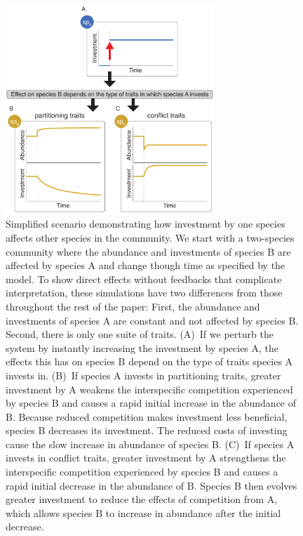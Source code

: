 \documentclass[11pt]{article}
\begin{document}
\begin{figure}[ht!]
\centering
\includegraphics[width=0.7\textwidth,keepaspectratio]{1-diagram}
\caption{Simplified scenario demonstrating how investment by
one species affects other species in the community. We start with a
two-species community where the abundance and investments of species B
are affected by species A and change though time as specified by the
model. To show direct effects without feedbacks that complicate
interpretation, these simulations have two differences from those
throughout the rest of the paper: First, the abundance and investments
of species A are constant and not affected by species B. Second, there
is only one suite of traits. (A)~If we perturb the system by instantly
increasing the investment by species A, the effects this has on species
B depend on the type of traits species A invests in. (B)~If species A
invests in partitioning traits, greater investment by A weakens the
interspecific competition experienced by species B and causes a rapid
initial increase in the abundance of B. Because reduced competition
makes investment less beneficial, species B decreases its investment.
The reduced costs of investing cause the slow increase in abundance of
species B. (C)~If species A invests in conflict traits, greater
investment by A strengthens the interspecific competition experienced by
species B and causes a rapid initial decrease in the abundance of B.
Species B then evolves greater investment to reduce the effects of
competition from A, which allows species B to increase in abundance
after the initial decrease.}
\label{fig:model-description}
\end{figure}
\end{document}
